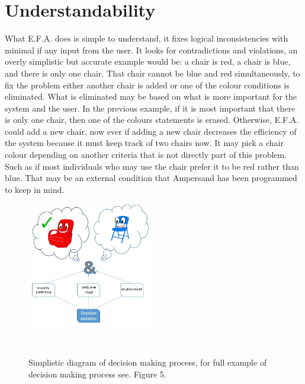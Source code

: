\documentclass[12pt]{report}
\begin{document}
\section{Understandability}
What E.F.A. does is simple to understand, it fixes logical inconsistencies with minimal if any 
input from the user. It looks for contradictions and violations, an overly simplistic but accurate 
example would be: a chair is red, a chair is blue, and there is only one chair. That chair cannot 
be blue and red simultaneously, to fix the problem either another chair is added or one of the 
colour conditions is eliminated. What is eliminated may be based on what is more important for the 
system and the user. In the previous example, if it is most important that there is only one chair, 
then one of the colours statements is erased. Otherwise, E.F.A. could add a new chair, now ever if 
adding a new chair decreases the efficiency of the system because it must keep track of two chairs 
now. It may pick a chair colour depending on another criteria that is not directly part of this 
problem. Such as if most individuals who may use the chair prefer it to be red rather than blue. 
That may be an external condition that Ampersand has been programmed to keep in mind. 
\begin{figure}
	\centering
	\includegraphics[width=0.5\textwidth]{../figures/blueorredchair}
	\caption{Simplistic diagram of decision making process, for full example of decision making 
	process see. Figure 5.}~\label{fig:figure4}
\end{figure}
\end{document}

